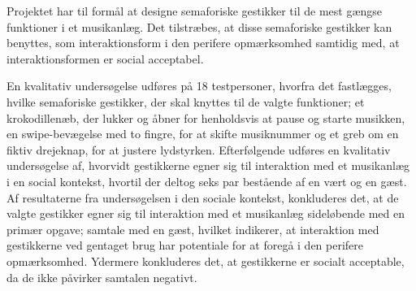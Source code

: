 Projektet har til formål at designe semaforiske gestikker til de mest gængse funktioner i et musikanlæg. Det tilstræbes, at disse semaforiske gestikker kan benyttes, som interaktionsform i den perifere opmærksomhed samtidig med, at interaktionsformen er social acceptabel. 

En kvalitativ undersøgelse udføres på 18 testpersoner, hvorfra det fastlægges, hvilke semaforiske gestikker, der skal knyttes til de valgte funktioner; et krokodillenæb, der lukker og åbner for henholdsvis at pause og starte musikken, en swipe-bevægelse med to fingre, for at skifte musiknummer og et greb om en fiktiv drejeknap, for at justere lydstyrken. Efterfølgende udføres en kvalitativ undersøgelse af, hvorvidt gestikkerne egner sig til interaktion med et musikanlæg i en social kontekst, hvortil der deltog seks par bestående af en vært og en gæst. Af resultaterne fra undersøgelsen i den sociale kontekst, konkluderes det, at de valgte gestikker egner sig til interaktion med et musikanlæg sideløbende med en primær opgave; samtale med en gæst, hvilket indikerer, at interaktion med gestikkerne ved gentaget brug har potentiale for at foregå i den perifere opmærksomhed. Ydermere konkluderes det, at gestikkerne er socialt acceptable, da de ikke påvirker samtalen negativt. 
